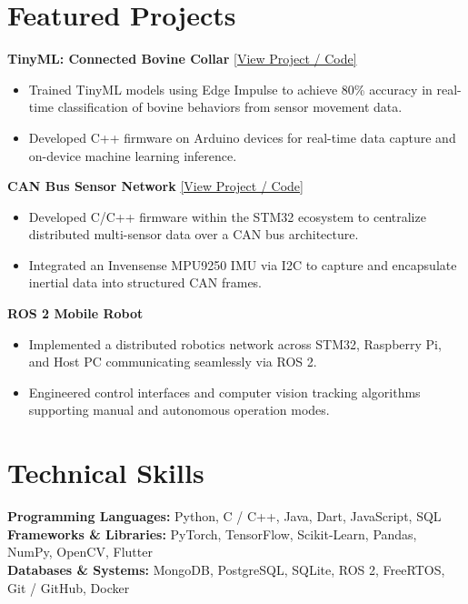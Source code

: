 \documentclass[10pt,a4paper]{article}
\begin{document}
\section{Featured Projects}
\noindent
\textbf{\color{primary} TinyML: Connected Bovine Collar}
\hfill {\footnotesize\href{https://github.com/SamuelLoureiro}{[View Project / Code]}}
\begin{itemize}
    \item \small Trained TinyML models using Edge Impulse to achieve 80\% accuracy in real-time classification of bovine behaviors from sensor movement data.
    \item \small Developed C++ firmware on Arduino devices for real-time data capture and on-device machine learning inference.
\end{itemize}
\noindent
\textbf{\color{primary} CAN Bus Sensor Network}
\hfill {\footnotesize\href{https://lnkd.in/es9Zi695}{[View Project / Code]}}
\begin{itemize}
    \item \small Developed C/C++ firmware within the STM32 ecosystem to centralize distributed multi-sensor data over a CAN bus architecture.
    \item \small Integrated an Invensense MPU9250 IMU via I2C to capture and encapsulate inertial data into structured CAN frames.
\end{itemize}
\noindent
\textbf{\color{primary} ROS 2 Mobile Robot}
\begin{itemize}
    \item \small Implemented a distributed robotics network across STM32, Raspberry Pi, and Host PC communicating seamlessly via ROS 2.
    \item \small Engineered control interfaces and computer vision tracking algorithms supporting manual and autonomous operation modes.
\end{itemize}

\section{Technical Skills}
\small
\noindent\textbf{Programming Languages:} Python, C / C++, Java, Dart, JavaScript, SQL\\[1.5pt]
\noindent\textbf{Frameworks \& Libraries:} PyTorch, TensorFlow, Scikit-Learn, Pandas, NumPy, OpenCV, Flutter\\[1.5pt]
\noindent\textbf{Databases \& Systems:} MongoDB, PostgreSQL, SQLite, ROS 2, FreeRTOS, Git / GitHub, Docker\\[1.5pt]
\end{document}

